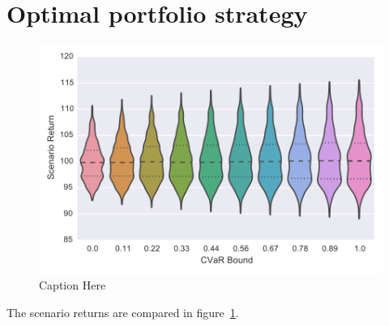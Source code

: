 \section{Optimal portfolio strategy}

\begin{figure}[tp]
\centering
\includegraphics{../pic/Scenario_Return.pdf}
\caption{Caption Here}
\label{fig:scenarioreturn}
\end{figure}

The scenario returns are compared in figure~\ref{fig:scenarioreturn}.